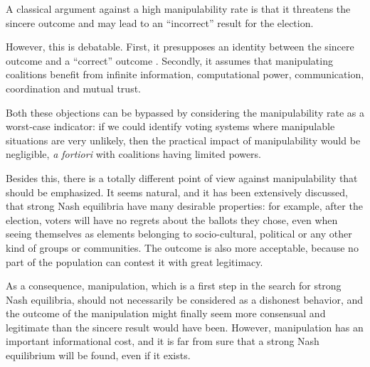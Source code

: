 

A classical argument against a high manipulability rate is that it threatens the sincere outcome and may lead to an ``incorrect'' result for the election.

However, this is debatable. First, it presupposes an identity between the sincere outcome and a ``correct'' outcome%
. Secondly, it assumes that manipulating coalitions benefit from infinite information, computational power, communication, coordination and mutual trust.

Both these objections can be bypassed by considering the manipulability rate as a worst-case indicator: if we could identify voting systems where manipulable situations are very unlikely, then the practical impact of manipulability would be negligible, \emph{a fortiori} with coalitions having limited powers.

\medskip
Besides this, there is a totally different point of view against manipulability that should be emphasized. It seems natural, and it has been extensively discussed, that strong Nash equilibria have many desirable properties: for example, after the election, voters will have no regrets about the ballots they chose, even when seeing themselves as elements belonging to socio-cultural, political or any other kind of groups or communities. The outcome is also more acceptable, because no part of the population can contest it with great legitimacy. 

As a consequence, manipulation, which is a first step in the search for strong Nash equilibria, should not necessarily be considered as a dishonest behavior, and the outcome of the manipulation might finally seem more consensual and legitimate than the sincere result would have been. However, manipulation has an important informational cost, and it is far from sure that a strong Nash equilibrium will be found, even if it exists.

